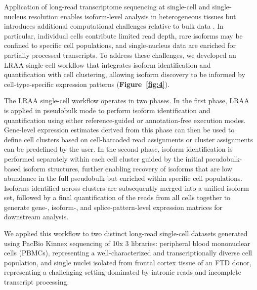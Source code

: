 Application of long-read transcriptome sequencing at single-cell and single-nucleus resolution enables isoform-level analysis in heterogeneous tissues but introduces additional computational challenges relative to bulk data \citep{gupta2024, kumari2024, alkhafaji2024, hardwick2022}. In particular, individual cells contribute limited read depth, rare isoforms may be confined to specific cell populations, and single-nucleus data are enriched for partially processed transcripts. To address these challenges, we developed an LRAA single-cell workflow that integrates isoform identification and quantification with cell clustering, allowing isoform discovery to be informed by cell-type-specific expression patterns (\textbf{Figure~\ref{fig:4}}).

The LRAA single-cell workflow operates in two phases. In the first phase, LRAA is applied in pseudobulk mode to perform isoform identification and quantification using either reference-guided or annotation-free execution modes. Gene-level expression estimates derived from this phase can then be used to define cell clusters based on cell-barcoded read assignments or cluster assignments can be predefined by the user. In the second phase, isoform identification is performed separately within each cell cluster guided by the initial pseudobulk-based isoform structures, further enabling recovery of isoforms that are low abundance in the full pseudobulk but enriched within specific cell populations. Isoforms identified across clusters are subsequently merged into a unified isoform set, followed by a final quantification of the reads from all cells together to generate gene-, isoform-, and splice-pattern-level expression matrices for downstream analysis.

We applied this workflow to two distinct long-read single-cell datasets generated using PacBio Kinnex sequencing of 10x 3\p{} libraries: peripheral blood mononuclear cells (PBMCs), representing a well-characterized and transcriptionally diverse cell population, and single nuclei isolated from frontal cortex tissue of an FTD donor, representing a challenging setting dominated by intronic reads and incomplete transcript processing.

\begin{center}

\end{center}

\label{fig:4}

